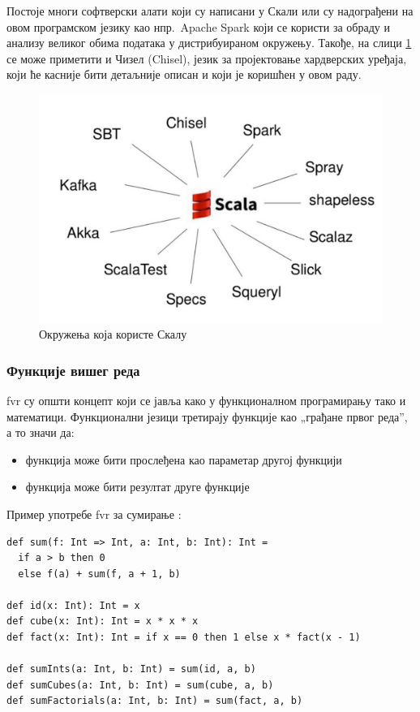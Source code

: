\documentclass[12pt, a4paper]{article}
\theoremstyle{definition}
\begin{document}
Постоје многи софтверски алати који су написани у Скали или су надограђени на овом програмском језику као нпр.\ Apache Spark који се користи за обраду и анализу великог обима података у дистрибуираном окружењу. Такође, на слици \ref{fig:scalaDer} се може приметити и Чизел (Chisel), језик за пројектовање хардверских уређаја, који ће касније бити детаљније описан и који је коришћен у овом раду.
\begin{figure}[H]
  \centering
      \includegraphics[scale=0.27]{slike/scalaDer}
  \caption{Окружења која користе Скалу}
  \label{fig:scalaDer}
\end{figure}

\subsubsection{Функције вишег реда}
\ac{fvr} су општи концепт који се јавља како у функционалном програмирању тако и математици. Функционални језици третирају функције као „грађане првог реда”, а то значи да:
\begin{itemize}
 \item функција може бити прослеђена као параметар другој функцији
 \item функција може бити резултат друге функције
\end{itemize}

Пример употребе \acs{fvr} за сумирање \cite{courseraHOF}:

\begin{verbatim}
def sum(f: Int => Int, a: Int, b: Int): Int =
  if a > b then 0
  else f(a) + sum(f, a + 1, b)

def id(x: Int): Int = x
def cube(x: Int): Int = x * x * x
def fact(x: Int): Int = if x == 0 then 1 else x * fact(x - 1)

def sumInts(a: Int, b: Int) = sum(id, a, b)
def sumCubes(a: Int, b: Int) = sum(cube, a, b)
def sumFactorials(a: Int, b: Int) = sum(fact, a, b)
\end{verbatim}
\end{document}
